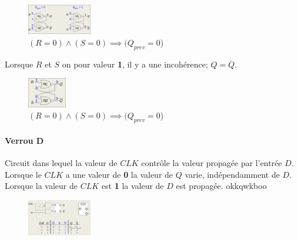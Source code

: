 \documentclass{report}
\begin{document}
\begin{multicols*}{3}
   \begin{figure}[H]
    \begin{center}
      \includegraphics[width=0.25\textwidth]{Latch3.png}
    \end{center}
    \caption{
        \tiny$(R = 0)\land(S = 0) \implies (Q_{prev} = 0$)} 
   \end{figure}


   Lorsque $R$ et $S$ on pour valeur \textbf{1}, 
   il y a une incohérence; $Q = \overline{Q}$. 


   \begin{figure}[H]
    \begin{center}
      \includegraphics[width=0.15\textwidth]{Latch4.png}
    \end{center}
    \caption{
        \tiny$(R = 0)\land(S = 0) \implies (Q_{prev} = 0$)} 
   \end{figure}


   \paragraph{Verrou D}

  
   Circuit dans lequel la valeur de $CLK$ contrôle 
   la valeur propagée par l'entrée $D$. Lorsque 
   le $CLK$ a une valeur de \textbf{0} la 
   valeur de $Q$ varie, indépendamment de 
   $D$. Lorsque la valeur de $CLK$ est \textbf{1}  
   la valeur de $D$ est propagée. 
   okkqwkboo

   \begin{figure}[H]
    \begin{center}
      \includegraphics[width=0.25\textwidth]{LatchD.png}
    \end{center}
    \caption{}
   \end{figure}
   
   
   

   

   
   


   







  

    

    
    







    \end{multicols*}
\end{document}
